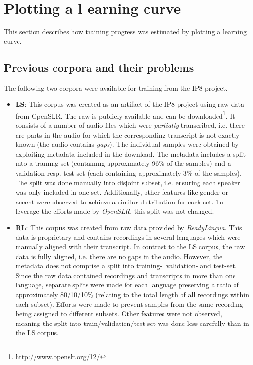 \section{Plotting a l                                                                                         earning curve}

This section describes how training progress was estimated by plotting a learning curve.

\subsection{Previous corpora and their problems}

The following two corpora were available for training from the IP8 project.

\begin{itemize}
	\item \textbf{\ac{LS}}: This corpus was created as an artifact of the IP8 project using raw data from OpenSLR. The raw is publicly available and can be downloaded\footnote{\url{http://www.openslr.org/12/}}. It consists of a number of audio files which were \textit{partially} transcribed, i.e. there are parts in the audio for which the corresponding transcript is not exactly known (the audio contains \textit{gaps}). The individual samples were obtained by exploiting metadata included in the download. The metadata includes a split into a training set (containing approximately 96\% of the samples) and a validation resp. test set (each containing approximately 3\% of the samples). The split was done manually into disjoint subset, i.e. ensuring each speaker was only included in one set. Additionally, other features like gender or accent were observed to achieve a similar distribution for each set. To leverage the efforts made by \textit{OpenSLR}, this split was not changed.
	\item \textbf{\ac{RL}}: This corpus was created from raw data provided by \textit{ReadyLingua}. This data is proprietary and contains recordings in several languages which were manually aligned with their transcript. In contrast to the \ac{LS} corpus, the raw data is fully aligned, i.e. there are no gaps in the audio. However, the metadata does not comprise a split into training-, validation- and test-set. Since the raw data contained recordings and transcripts in more than one language, separate splits were made for each language preserving a ratio of approximately 80/10/10\% (relating to the total length of all recordings within each subset). Efforts were made to prevent samples from the same recording being assigned to different subsets. Other features were not observed, meaning the split into train/validation/test-set was done less carefully than in the \ac{LS} corpus.
\end{itemize}

